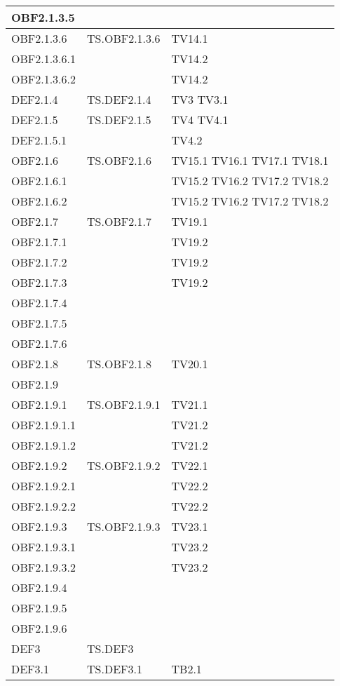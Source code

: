 \documentclass{scalatekids-article}
\begin{document}
\begin{longtable}[H]{|l|p{4cm}|p{4cm}|}
  \hline
  OBF2.1.3.5 & &\\ %
  \hline
  OBF2.1.3.6 & TS.OBF2.1.3.6 & TV14.1\\
  \hline
  OBF2.1.3.6.1 & & TV14.2\\
  \hline
  OBF2.1.3.6.2 & & TV14.2\\
  \hline
  DEF2.1.4 & TS.DEF2.1.4 & TV3 TV3.1\\
  \hline
  DEF2.1.5 & TS.DEF2.1.5 & TV4 TV4.1\\
  \hline
  DEF2.1.5.1 & & TV4.2\\
  \hline
  OBF2.1.6 & TS.OBF2.1.6 & TV15.1 TV16.1 TV17.1 TV18.1\\
  \hline
  OBF2.1.6.1 & & TV15.2 TV16.2 TV17.2 TV18.2\\
  \hline
  OBF2.1.6.2 & & TV15.2 TV16.2 TV17.2 TV18.2\\
  \hline
  OBF2.1.7 & TS.OBF2.1.7 & TV19.1\\
  \hline
  OBF2.1.7.1 & & TV19.2\\
  \hline
  OBF2.1.7.2 & & TV19.2\\
  \hline
  OBF2.1.7.3 & & TV19.2\\
  \hline
  OBF2.1.7.4 & &\\ %
  \hline
  OBF2.1.7.5 & &\\ %
  \hline
  OBF2.1.7.6 & &\\ %
  \hline
  OBF2.1.8 & TS.OBF2.1.8 & TV20.1\\
  \hline
  OBF2.1.9 & &\\
  \hline
  OBF2.1.9.1 & TS.OBF2.1.9.1 & TV21.1\\
  \hline
  OBF2.1.9.1.1 & & TV21.2\\
  \hline
  OBF2.1.9.1.2 & & TV21.2\\
  \hline
  OBF2.1.9.2 & TS.OBF2.1.9.2 & TV22.1\\
  \hline
  OBF2.1.9.2.1 & & TV22.2\\
  \hline
  OBF2.1.9.2.2 & & TV22.2\\
  \hline
  OBF2.1.9.3 & TS.OBF2.1.9.3 & TV23.1\\
  \hline
  OBF2.1.9.3.1 & & TV23.2\\
  \hline
  OBF2.1.9.3.2 & & TV23.2\\
  \hline
  OBF2.1.9.4 & &\\ %
  \hline
  OBF2.1.9.5 & &\\ %
  \hline
  OBF2.1.9.6 & &\\ %
  \hline
  DEF3 & TS.DEF3 & \\
  \hline
  DEF3.1 & TS.DEF3.1 & TB2.1\\

\end{longtable}
\end{document}
